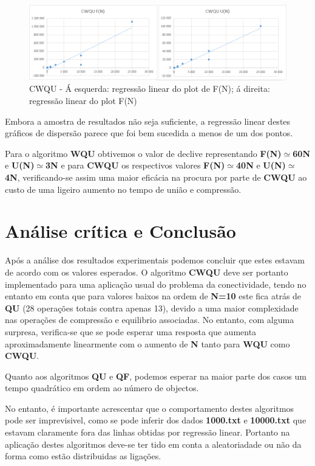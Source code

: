 \documentclass[10pt,a4paper]{article}
\begin{document}
\begin{figure}[h!]
\includegraphics[scale=0.35]{CWQUgraphs.png}
\caption{CWQU - Á esquerda: regressão linear do plot de F(N); á direita: regressão linear do plot F(N) }
\end{figure}

\par Embora a amostra de resultados não seja suficiente, a regressão linear destes gráficos de dispersão parece que foi bem sucedida a menos de um dos pontos. 
\par Para o algoritmo \textbf{WQU} obtivemos o valor de declive representando \textbf{F(N)$\simeq$60N} e \textbf{U(N)$\simeq$3N} e para \textbf{CWQU} os respectivos valores \textbf{F(N)$\simeq$40N} e \textbf{U(N)$\simeq$4N}, verificando-se assim uma maior eficácia na procura por parte de \textbf{CWQU} ao custo de uma ligeiro aumento no tempo de união e compressão.


\section{Análise crítica e Conclusão}

\par Após a análise dos resultados experimentais podemos concluir que estes estavam de acordo com os valores esperados. O algoritmo \textbf{CWQU} deve ser portanto implementado para uma aplicação usual do problema da conectividade, tendo no entanto em conta que para valores baixos na ordem de \textbf{N=10} este fica atrás de \textbf{QU} (28 operações totais contra apenas 13), devido a uma maior complexidade nas operações de compressão e equilibrio associadas. No entanto, com alguma surpresa, verifica-se que se pode esperar uma resposta que aumenta aproximadamente linearmente com o aumento de \textbf{N} tanto para \textbf{WQU} como \textbf{CWQU}. 
\par Quanto aos algoritmos \textbf{QU} e \textbf{QF}, podemos esperar na maior parte dos casos um tempo quadrático em ordem ao número de objectos.
\par No entanto, é importante acrescentar que o comportamento destes algoritmos pode ser imprevisivel, como se pode inferir dos dados \textbf{1000.txt} e \textbf{10000.txt} que estavam claramente fora das linhas obtidas por regressão linear. Portanto na aplicação destes algoritmos deve-se ter tido em conta a aleatoriadade ou não da forma como estão distribuidas as ligações.
\end{document}
